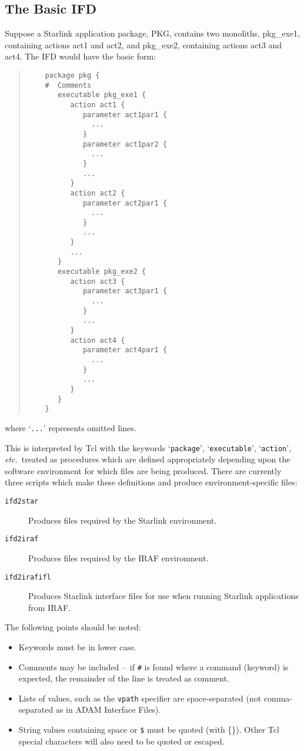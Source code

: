 \documentclass[twoside,11pt]{article}
\newcommand{\htmladdnormallink}[2]{#1}
\newcommand{\htmlref}[2]{#1}
\newcommand{\xlabel}[1]{}
\newcommand{\TCLURL}{http://sunscript.sun.com/tcltext.html}
\newcommand{\dash}{--}
\newcommand{\dash}{-}
\begin{document}
\subsection{\xlabel{the_basic_ifd}The Basic IFD}
Suppose a Starlink application package, PKG, contains two monoliths,
pkg\_exe1, containing actions act1 and act2, and pkg\_exe2, containing actions
act3 and act4. The IFD would have the basic form:
\begin{quote} \begin{verbatim}
    package pkg {
    #  Comments
       executable pkg_exe1 {
          action act1 {
             parameter act1par1 {
               ...
             }
             parameter act1par2 {
               ...
             }
             ...
          }
          action act2 {
             parameter act2par1 {
               ...
             }
             ...
          }
          ...
       }
       executable pkg_exe2 {
          action act3 {
             parameter act3par1 {
               ...
             }
             ...
          }
          action act4 {
             parameter act4par1 {
               ...
             }
             ...
          }
       }
    }
\end{verbatim} \end{quote}
where `\texttt{...}' represents omitted lines.

This is interpreted by
\htmladdnormallink{Tcl}{\TCLURL}
with the keywords `\texttt{package}', `\texttt{executable}', `\texttt{action}', 
\textit{etc.}\ treated as procedures which are defined appropriately depending
upon the software environment for which files are being produced. 
There are currently three scripts which make these definitions and produce
environment-specific files:
\begin{description}
\item[\htmlref{\texttt{ifd2star}}{ifd2star}] Produces files required by the 
Starlink environment.
\item[\htmlref{\texttt{ifd2iraf}}{ifd2iraf}] Produces files required by the 
IRAF environment.
\item[\htmlref{\texttt{ifd2irafifl}}{ifd2irafifl}] Produces Starlink interface 
files for use when running Starlink applications from IRAF.
\end{description}

The following points should be noted:
\begin{itemize}
\item Keywords must be in lower case.
\item Comments may be included \dash\ if \texttt{\#} is found where a command 
(keyword) is expected, the remainder of the line is treated as comment.
\item Lists of values, such as the
\htmlref{\texttt{vpath}}{vpath} specifier are space-separated (not 
comma-separated as in ADAM Interface Files).
\item String values containing space or \texttt{\$} must be quoted (with 
\{\}).
Other Tcl special characters will also need to be quoted or escaped.
\end{itemize}
\end{document}

